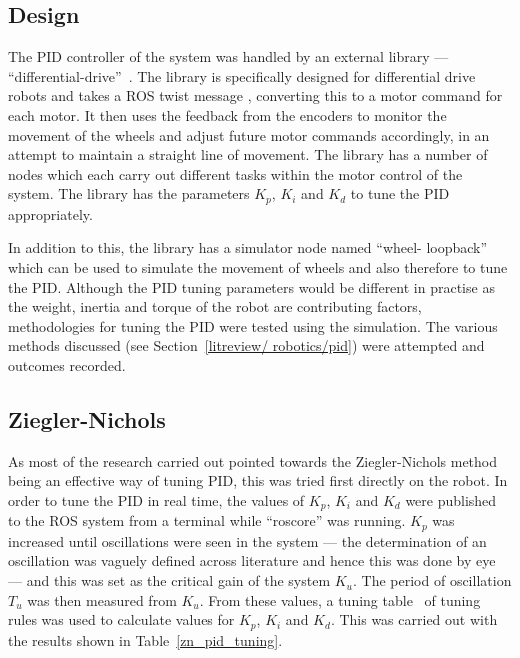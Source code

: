 \subsection{Design}\label{soft/PID/design}
The PID controller of the system was handled by an external library --- 
``differential-drive''~\cite{diffdrivelib}. The library is specifically 
designed for differential drive robots and takes a ROS twist message
, converting this to a motor command for each 
motor. It then uses the feedback from the encoders to monitor the movement 
of the wheels and adjust future motor commands accordingly, in an attempt 
to maintain a straight line of movement. The library has a number of nodes 
which each  carry out different tasks within the motor control of the 
system. The library has the parameters $ K_p $, $ K_i $ and $ K_d $ to 
tune the PID appropriately. 

In addition to this, the library has a simulator node named ``wheel-
loopback'' which can be used to simulate the movement of wheels and also 
therefore to tune the PID. Although the PID tuning parameters would be 
different in practise as the weight, inertia and torque of the robot are 
contributing factors, methodologies for tuning the PID were tested using 
the simulation. The various methods discussed (see Section~\ref{litreview/
robotics/pid}) were attempted and outcomes recorded. 

\subsection{Ziegler-Nichols}\label{soft/PID/zn}
As most of the research carried out pointed towards the Ziegler-Nichols 
method being an effective way of tuning PID, this was tried first directly 
on the robot. In order to tune the PID in real time, the values of $ K_p 
$, $ K_i $ and $ K_d $ were published to the ROS system from a terminal 
while ``roscore'' was running. $K_p$ was increased until oscillations were 
seen in the system --- the determination of an oscillation was vaguely 
defined across literature and hence this was done by eye --- and this was 
set as the critical gain of the system $K_u$. The period of oscillation 
$T_u$ was then measured from $K_u$. From these values, a tuning table~
\cite{mccormack1998rule} of tuning rules was used to calculate values for 
$K_p$, $ K_i $ and $ K_d $.  This was carried out with the results shown 
in Table~\ref{zn_pid_tuning}.

